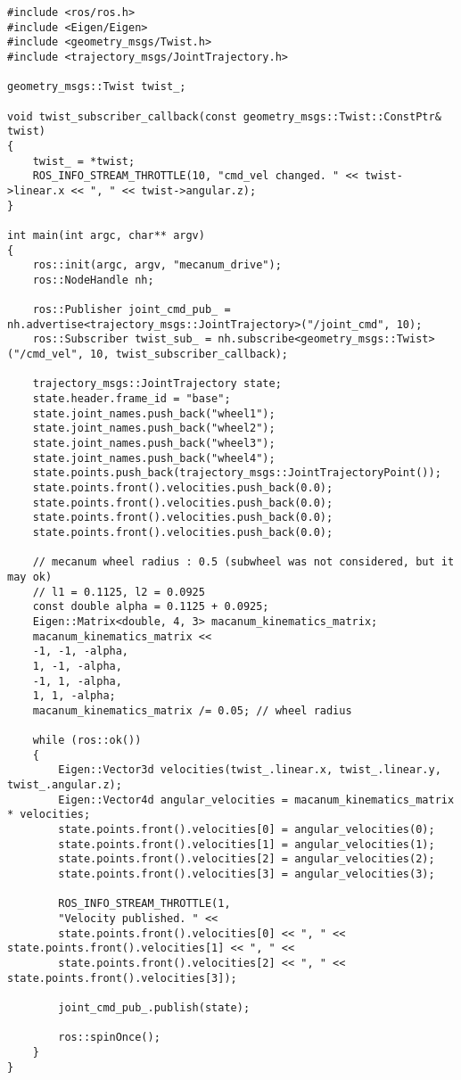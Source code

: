 \documentclass{article}
\begin{document}
\begin{verbatim}
#include <ros/ros.h>
#include <Eigen/Eigen>
#include <geometry_msgs/Twist.h>
#include <trajectory_msgs/JointTrajectory.h>
  
geometry_msgs::Twist twist_;
  
void twist_subscriber_callback(const geometry_msgs::Twist::ConstPtr& twist)
{
	twist_ = *twist;
	ROS_INFO_STREAM_THROTTLE(10, "cmd_vel changed. " << twist->linear.x << ", " << twist->angular.z);
}
  
int main(int argc, char** argv)
{
	ros::init(argc, argv, "mecanum_drive");
	ros::NodeHandle nh;
	  
	ros::Publisher joint_cmd_pub_ = nh.advertise<trajectory_msgs::JointTrajectory>("/joint_cmd", 10);
	ros::Subscriber twist_sub_ = nh.subscribe<geometry_msgs::Twist>("/cmd_vel", 10, twist_subscriber_callback);
	  
	trajectory_msgs::JointTrajectory state;
	state.header.frame_id = "base";
	state.joint_names.push_back("wheel1");
	state.joint_names.push_back("wheel2");
	state.joint_names.push_back("wheel3");
	state.joint_names.push_back("wheel4");
	state.points.push_back(trajectory_msgs::JointTrajectoryPoint());
	state.points.front().velocities.push_back(0.0);
	state.points.front().velocities.push_back(0.0);
	state.points.front().velocities.push_back(0.0);
	state.points.front().velocities.push_back(0.0);
	  
	// mecanum wheel radius : 0.5 (subwheel was not considered, but it may ok)
	// l1 = 0.1125, l2 = 0.0925
	const double alpha = 0.1125 + 0.0925;
	Eigen::Matrix<double, 4, 3> macanum_kinematics_matrix;
	macanum_kinematics_matrix <<
	-1, -1, -alpha,
	1, -1, -alpha,
	-1, 1, -alpha,
	1, 1, -alpha;
	macanum_kinematics_matrix /= 0.05; // wheel radius
  
	while (ros::ok())
	{
		Eigen::Vector3d velocities(twist_.linear.x, twist_.linear.y, twist_.angular.z);
		Eigen::Vector4d angular_velocities = macanum_kinematics_matrix * velocities;
		state.points.front().velocities[0] = angular_velocities(0);
		state.points.front().velocities[1] = angular_velocities(1);
		state.points.front().velocities[2] = angular_velocities(2);
		state.points.front().velocities[3] = angular_velocities(3);
		  
		ROS_INFO_STREAM_THROTTLE(1,
		"Velocity published. " <<
		state.points.front().velocities[0] << ", " << state.points.front().velocities[1] << ", " <<
		state.points.front().velocities[2] << ", " << state.points.front().velocities[3]);
		  
		joint_cmd_pub_.publish(state);
		  
		ros::spinOnce();
	}
}
\end{verbatim}
\end{document}
